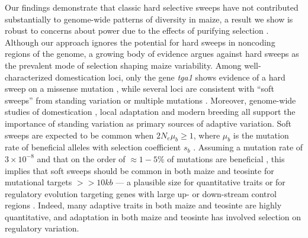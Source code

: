 \documentclass{pnastwo}
\begin{document}
\begin{article}
Our findings demonstrate that classic hard selective sweeps have not contributed substantially to genome-wide patterns of diversity in maize, a result we show is robust to concerns about power due to the effects of purifying selection  \cite{enard2014}. 
Although our approach ignores the potential for hard sweeps in noncoding regions of the genome, a growing body of evidence argues against hard sweeps as the prevalent mode of selection shaping maize variability. 
Among well-characterized domestication loci, only the gene \emph{tga1} shows evidence of a hard sweep on a missense mutation \cite{wang2015}, while several loci are consistent with ``soft sweeps''  from standing variation \cite{studer2011,gallavotti2004role} or multiple mutations \cite{wills2013}. 
Moreover, genome-wide studies of domestication \cite{hufford2012},  local adaptation \cite{Takuno15062015} and modern breeding \cite{van2012historical, beissinger2014} all support the importance of standing variation as primary sources of adaptive variation. 
Soft sweeps are expected to be common when $2N_e\mu_b \ge 1$, where $\mu_b$ is the mutation rate of beneficial alleles with selection coefficient $s_b$ \cite{messer2013}. Assuming a mutation rate of $3 \times 10^{-8}$ \cite{clark2005} and that on the order of $\approx 1-5\%$ of mutations are beneficial \cite{eyre2007}, this implies that soft sweeps should be common in both maize and teosinte for mutational targets $>>10kb$ --- a plausible size for quantitative traits or for regulatory evolution targeting genes with large up- or down-stream control regions \cite[e.g.]{studer2011}.
Indeed, many adaptive traits in both maize \cite{wallace2014} and teosinte \cite{weber2008} are highly quantitative,  and adaptation in both maize \cite{hufford2012} and teosinte \cite{pyhajarvi2013} has involved selection on regulatory variation.


\end{article}
\end{document}
